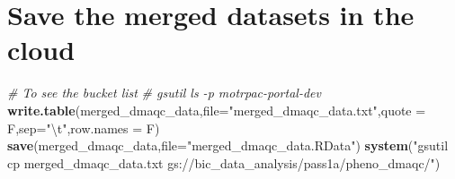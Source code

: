 \documentclass[]{article}
\newenvironment{Shaded}{\begin{snugshade}}{\end{snugshade}}
\newcommand{\KeywordTok}[1]{\textcolor[rgb]{0.13,0.29,0.53}{\textbf{#1}}}
\newcommand{\DataTypeTok}[1]{\textcolor[rgb]{0.13,0.29,0.53}{#1}}
\newcommand{\CharTok}[1]{\textcolor[rgb]{0.31,0.60,0.02}{#1}}
\newcommand{\StringTok}[1]{\textcolor[rgb]{0.31,0.60,0.02}{#1}}
\newcommand{\CommentTok}[1]{\textcolor[rgb]{0.56,0.35,0.01}{\textit{#1}}}
\newcommand{\NormalTok}[1]{#1}
\begin{document}
\section{Save the merged datasets in the
cloud}\label{save-the-merged-datasets-in-the-cloud}

\begin{Shaded}
\begin{Highlighting}[]
\CommentTok{# To see the bucket list}
\CommentTok{# gsutil ls -p motrpac-portal-dev}
\KeywordTok{write.table}\NormalTok{(merged_dmaqc_data,}\DataTypeTok{file=}\StringTok{"merged_dmaqc_data.txt"}\NormalTok{,}\DataTypeTok{quote =}\NormalTok{ F,}\DataTypeTok{sep=}\StringTok{"}\CharTok{\textbackslash{}t}\StringTok{"}\NormalTok{,}\DataTypeTok{row.names =}\NormalTok{ F)}
\KeywordTok{save}\NormalTok{(merged_dmaqc_data,}\DataTypeTok{file=}\StringTok{"merged_dmaqc_data.RData"}\NormalTok{)}
\KeywordTok{system}\NormalTok{(}\StringTok{"gsutil cp merged_dmaqc_data.txt gs://bic_data_analysis/pass1a/pheno_dmaqc/"}\NormalTok{)}
\end{Highlighting}
\end{Shaded}
\end{document}
